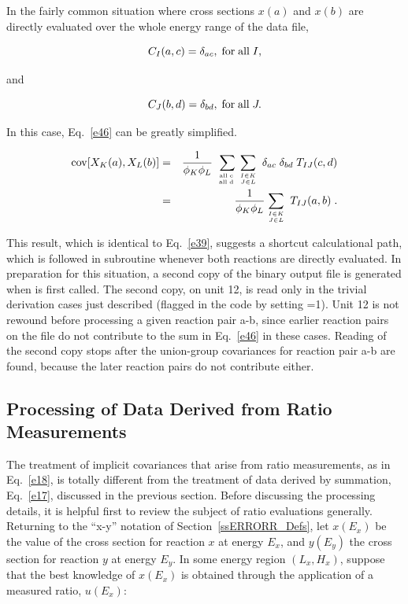 In the fairly common situation where cross sections $x(a)$ and $x(b)$
are directly evaluated over the whole energy range of the data
file,

\begin{equation}
C_I(a,c) = \delta_{ac},\; {\rm for \; all} \; I,
\end{equation}

\noindent
and

\begin{equation}
C_J(b,d) = \delta_{bd},\; {\rm for \; all} \; J.
\end{equation}

\noindent
In this case, Eq.~\ref{e46} can be greatly simplified.

\begin{eqnarray}
  {\rm {\rm cov}} [X_K(a),X_L(b)] & =
  & \frac{1}{\phi_K \phi_L}\;\sum_{{\rm all \; c\;}
  \atop{\rm all \;d\;}}
  \sum_{I\in K\atop {J \in L}} \;\delta_{ac} \; \delta_{bd} \;
  T_{IJ} (c,d)  \nonumber \\ & = &
  \frac{1}{\phi_K \phi_L} \sum_{I\in K\atop {J \in L}} \;
  T_{IJ} (a,b) \; .
\end{eqnarray}

This result, which is identical to Eq.~\ref{e39}, suggests a shortcut
calculational path, which is followed in subroutine
 whenever both reactions
are directly evaluated.  In preparation for this situation, a second
copy of the  binary output file
is generated when  is first called.  The second copy, on
unit 12, is read only in the trivial derivation cases just described
(flagged in the code by setting =1).  Unit 12 is not rewound
before processing a given reaction pair a-b, since earlier reaction
pairs on the file do not contribute to the sum in Eq.~\ref{e46} in these
cases.  Reading of the second copy stops after the union-group
covariances for reaction pair a-b are found, because the later reaction
pairs do not contribute either.


\subsection{Processing of Data Derived from Ratio Measurements}
\label{ssERRORR_Ratio}

The treatment of implicit covariances that arise from ratio
measurements, as in Eq.~\ref{e18}, is totally different from the treatment
of data derived by summation, Eq.~\ref{e17}, discussed in the previous
section.  Before discussing the processing details, it is helpful first
to review the subject of ratio evaluations generally.  Returning to the
``x-y'' notation of Section~\ref{ssERRORR_Defs}, let $x(E_x)$ be the
value of the cross
section for reaction $x$ at energy $E_x$, and $y(E_y)$ the cross
section for reaction $y$ at energy $E_y$.  In some energy region
$(L_x,H_x)$, suppose that the best knowledge of $x(E_x)$ is obtained
through the application of a measured ratio, $u(E_x)$:

